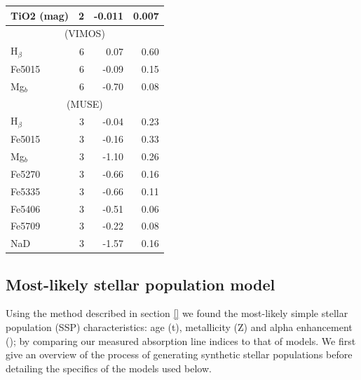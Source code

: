 \begin{table}
\begin{tabular}{l r r r}
			TiO2 (mag)	& 2 		& -0.011	& 0.007	\\
			\hline
			\multicolumn{4}{c}{\citet{Ogando2008} (VIMOS)} \\
			\hline
			H$_\beta$ 	& 6 		& 0.07		& 0.60	\\
			Fe5015 		& 6 		& -0.09		& 0.15	\\
			Mg$_b$ 		& 6 		& -0.70		& 0.08	\\
			\hline
			\multicolumn{4}{c}{\citet{Ogando2008} (MUSE)} \\
			\hline
			H$_\beta$ 	& 3 		& -0.04		& 0.23	\\ 
			Fe5015 		& 3 		& -0.16		& 0.33	\\ 
			Mg$_b$ 		& 3 		& -1.10		& 0.26	\\
			Fe5270 		& 3 		& -0.66		& 0.16	\\
			Fe5335 		& 3 		& -0.66		& 0.11	\\
			Fe5406 		& 3 		& -0.51		& 0.06	\\
			Fe5709 		& 3 		& -0.22		& 0.08	\\
			NaD 		& 3 		& -1.57		& 0.16	\\
			\hline
		\end{tabular}
	\end{table}



	\subsection{Most-likely stellar population model}
		\label{subsec:ssp}
		Using the method described in section \ref{} we found the most-likely simple stellar population (SSP) characteristics: age (t), metallicity (Z) and alpha enhancement (\textalpha); by comparing our measured absorption line indices to that of models. We first give an overview of the process of generating synthetic stellar populations before detailing the specifics of the models used below. 

